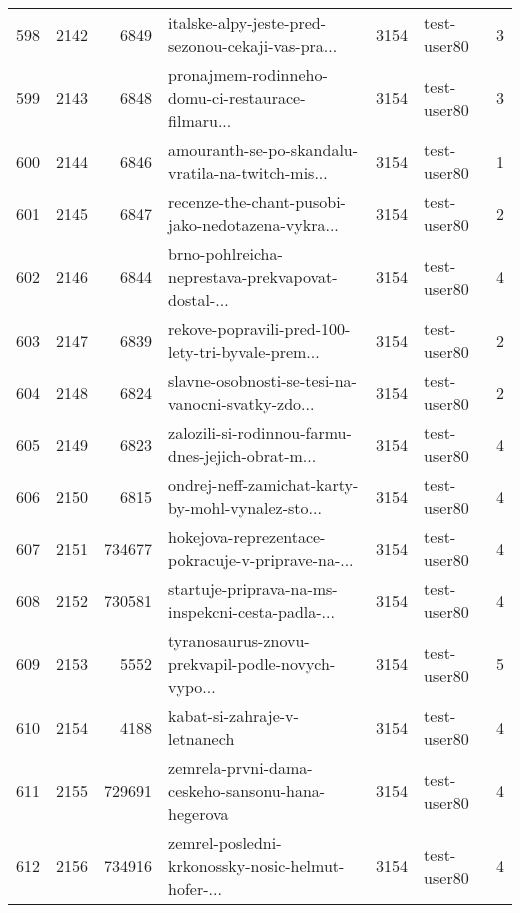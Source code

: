 \begin{tabular}{lrrlrlr}
598  &       2142 &     6849 &  italske-alpy-jeste-pred-sezonou-cekaji-vas-pra... &     3154 &                  test-user80 &               3 \\
599  &       2143 &     6848 &  pronajmem-rodinneho-domu-ci-restaurace-filmaru... &     3154 &                  test-user80 &               3 \\
600  &       2144 &     6846 &  amouranth-se-po-skandalu-vratila-na-twitch-mis... &     3154 &                  test-user80 &               1 \\
601  &       2145 &     6847 &  recenze-the-chant-pusobi-jako-nedotazena-vykra... &     3154 &                  test-user80 &               2 \\
602  &       2146 &     6844 &  brno-pohlreicha-neprestava-prekvapovat-dostal-... &     3154 &                  test-user80 &               4 \\
603  &       2147 &     6839 &  rekove-popravili-pred-100-lety-tri-byvale-prem... &     3154 &                  test-user80 &               2 \\
604  &       2148 &     6824 &  slavne-osobnosti-se-tesi-na-vanocni-svatky-zdo... &     3154 &                  test-user80 &               2 \\
605  &       2149 &     6823 &  zalozili-si-rodinnou-farmu-dnes-jejich-obrat-m... &     3154 &                  test-user80 &               4 \\
606  &       2150 &     6815 &  ondrej-neff-zamichat-karty-by-mohl-vynalez-sto... &     3154 &                  test-user80 &               4 \\
607  &       2151 &   734677 &  hokejova-reprezentace-pokracuje-v-priprave-na-... &     3154 &                  test-user80 &               4 \\
608  &       2152 &   730581 &  startuje-priprava-na-ms-inspekcni-cesta-padla-... &     3154 &                  test-user80 &               4 \\
609  &       2153 &     5552 &  tyranosaurus-znovu-prekvapil-podle-novych-vypo... &     3154 &                  test-user80 &               5 \\
610  &       2154 &     4188 &                       kabat-si-zahraje-v-letnanech &     3154 &                  test-user80 &               4 \\
611  &       2155 &   729691 &   zemrela-prvni-dama-ceskeho-sansonu-hana-hegerova &     3154 &                  test-user80 &               4 \\
612  &       2156 &   734916 &  zemrel-posledni-krkonossky-nosic-helmut-hofer-... &     3154 &                  test-user80 &               4 \\

\end{tabular}
